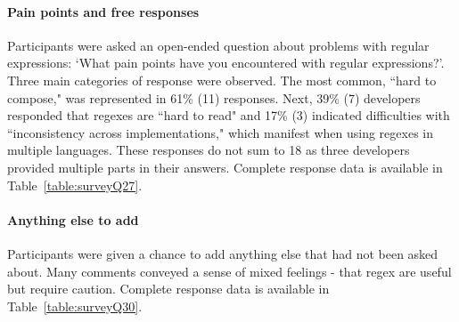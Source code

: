 \paragraph{Pain points and free responses}\label{sec:painPoints}  Participants were asked an open-ended question about problems with regular expressions: `What pain points have you encountered with regular expressions?'.  Three main categories of response were observed. The most common, ``hard to compose," was represented in 61\% (11) responses. Next, 39\% (7) developers responded that regexes are ``hard to read" and 17\% (3) indicated difficulties with ``inconsistency across implementations," which manifest when using regexes in multiple languages. These responses do not sum to 18 as three developers provided multiple parts in their answers.  Complete response data is available in Table~\ref{table:surveyQ27}.

\paragraph{Anything else to add}  Participants were given a chance to add anything else that had not been asked about.  Many comments conveyed a sense of mixed feelings - that regex are useful but require caution.  Complete response data is available in Table~\ref{table:surveyQ30}.
